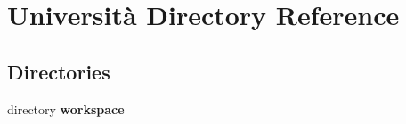 \section{Università Directory Reference}
\label{dir_b54d49173e0f486d53969738c1d254b6}
\subsection*{Directories}
\begin{DoxyCompactItemize}
\item 
directory \textbf{ workspace}
\end{DoxyCompactItemize}
